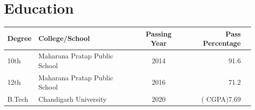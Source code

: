 \documentclass[11pt]{article}
\begin{document}
\section{Education}
\begin{flushright}

\begin{tabular}{||l|l|c|r|r||}
\hline
Degree & College/School  & Passing Year & Pass Percentage \\
\hline 
10th & Maharana Pratap Public School & 2014 & 91.6\\
12th & Maharana Pratap Public School & 2016 & 71.2\\
B.Tech & Chandigarh University & 2020 & ( CGPA)7.69\\
\hline
\end{tabular}
 \end{flushright} 

\end{document}
